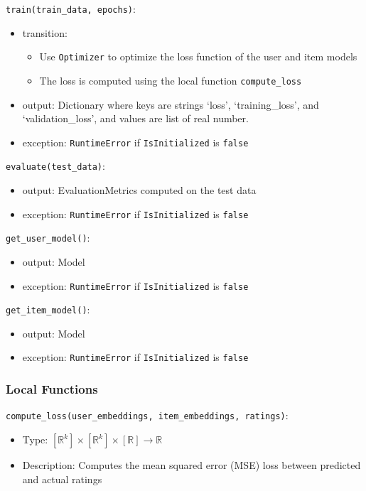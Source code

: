 \documentclass[12pt, titlepage]{article}
\begin{document}
\noindent \texttt{train(train\_data, epochs)}:
\begin{itemize}
\item transition:
\begin{itemize}
  \item Use \texttt{Optimizer} to optimize the loss function of the user and item models
  \item The loss is computed using the local function \texttt{compute\_loss}
\end{itemize}
\item output: Dictionary where keys are strings `loss', `training\_loss', and `validation\_loss', and values are list of real number.
\item exception: \texttt{RuntimeError} if \texttt{IsInitialized} is \texttt{false}
\end{itemize}

\noindent \texttt{evaluate(test\_data)}:
\begin{itemize}
\item output: EvaluationMetrics computed on the test data
\item exception: \texttt{RuntimeError} if \texttt{IsInitialized} is \texttt{false}
\end{itemize}

\noindent \texttt{get\_user\_model()}:
\begin{itemize}
\item output: Model
\item exception: \texttt{RuntimeError} if \texttt{IsInitialized} is \texttt{false}
\end{itemize}

\noindent \texttt{get\_item\_model()}:
\begin{itemize}
\item output: Model
\item exception: \texttt{RuntimeError} if \texttt{IsInitialized} is \texttt{false}
\end{itemize}

\subsubsection{Local Functions}

\noindent \texttt{compute\_loss(user\_embeddings, item\_embeddings, ratings)}:
\begin{itemize}
\item Type: $[\mathbb{R}^k] \times [\mathbb{R}^k] \times [\mathbb{R}] \rightarrow \mathbb{R}$
\item Description: Computes the mean squared error (MSE) loss between predicted and actual ratings
\end{itemize}
\end{document}
